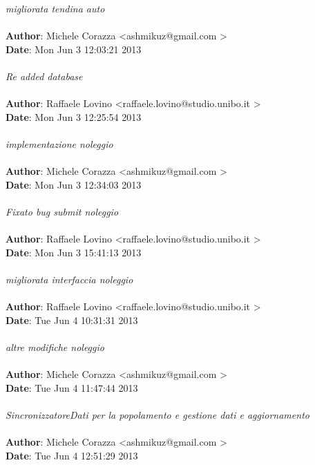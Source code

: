\documentclass[a4paper,12pt]{article} %
\begin{document}
    \emph{migliorata tendina auto}\\
\\
\textbf{Author}: Michele Corazza \textless ashmikuz@gmail.com \textgreater \\
\textbf{Date}:   Mon Jun 3 12:03:21 2013 \\
\\
    \emph{Re added database}\\
\\
\textbf{Author}: Raffaele Lovino \textless raffaele.lovino@studio.unibo.it \textgreater \\
\textbf{Date}:   Mon Jun 3 12:25:54 2013 \\
\\
    \emph{implementazione noleggio}\\
\\
\textbf{Author}: Michele Corazza \textless ashmikuz@gmail.com \textgreater \\
\textbf{Date}:   Mon Jun 3 12:34:03 2013 \\
\\
    \emph{Fixato bug submit noleggio}\\
\\
\textbf{Author}: Raffaele Lovino \textless raffaele.lovino@studio.unibo.it \textgreater \\
\textbf{Date}:   Mon Jun 3 15:41:13 2013 \\
\\
    \emph{migliorata interfaccia noleggio}\\
\\
\textbf{Author}: Raffaele Lovino \textless raffaele.lovino@studio.unibo.it \textgreater \\
\textbf{Date}:   Tue Jun 4 10:31:31 2013 \\
\\
    \emph{altre modifiche noleggio}\\
\\
\textbf{Author}: Michele Corazza \textless ashmikuz@gmail.com \textgreater \\
\textbf{Date}:   Tue Jun 4 11:47:44 2013 \\
\\
    \emph{SincronizzatoreDati per la popolamento e gestione dati e aggiornamento}\\
\\
\textbf{Author}: Michele Corazza \textless ashmikuz@gmail.com \textgreater \\
\textbf{Date}:   Tue Jun 4 12:51:29 2013 \\
\end{document}

